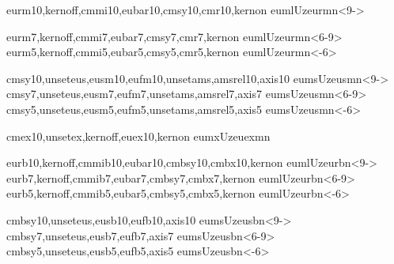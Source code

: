 
%




\installfonts


%
      {eurm10,kernoff,cmmi10,eubar10,cmsy10,cmr10,kernon}
      {euml}{U}{zeur}{m}{n}{<9->}
   
      {eurm7,kernoff,cmmi7,eubar7,cmsy7,cmr7,kernon}
      {euml}{U}{zeur}{m}{n}{<6-9>}
      {eurm5,kernoff,cmmi5,eubar5,cmsy5,cmr5,kernon}
      {euml}{U}{zeur}{m}{n}{<-6>}


      {cmsy10,unseteus,eusm10,eufm10,unsetams,amsrel10,axis10}
      {eums}{U}{zeus}{m}{n}{<9->}
      {cmsy7,unseteus,eusm7,eufm7,unsetams,amsrel7,axis7}
      {eums}{U}{zeus}{m}{n}{<6-9>}
      {cmsy5,unseteus,eusm5,eufm5,unsetams,amsrel5,axis5}
      {eums}{U}{zeus}{m}{n}{<-6>}

%
      {cmex10,unsetex,kernoff,euex10,kernon}
      {eumx}{U}{zeuex}{m}{n}{}


      {eurb10,kernoff,cmmib10,eubar10,cmbsy10,cmbx10,kernon}
      {euml}{U}{zeur}{b}{n}{<9->}
      {eurb7,kernoff,cmmib7,eubar7,cmbsy7,cmbx7,kernon}
      {euml}{U}{zeur}{b}{n}{<6-9>}
      {eurb5,kernoff,cmmib5,eubar5,cmbsy5,cmbx5,kernon}
      {euml}{U}{zeur}{b}{n}{<-6>}

      {cmbsy10,unseteus,eusb10,eufb10,axis10}
      {eums}{U}{zeus}{b}{n}{<9->}
      {cmbsy7,unseteus,eusb7,eufb7,axis7}
      {eums}{U}{zeus}{b}{n}{<6-9>}
      {cmbsy5,unseteus,eusb5,eufb5,axis5}
      {eums}{U}{zeus}{b}{n}{<-6>}

   
\endinstallfonts

\bye

